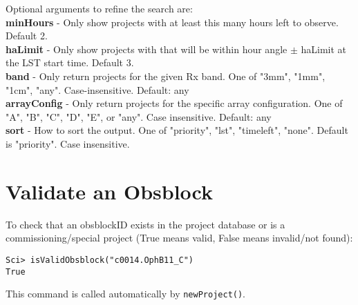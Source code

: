 \documentclass[preprint]{aastex} %
\begin{document}
\noindent Optional arguments to refine the search are:\\
{\bf minHours} - Only show projects with at least this many hours left to observe. Default 2.\\
{\bf haLimit} - Only show projects with that will be within hour angle $\pm$ haLimit at the LST start time. Default 3.\\
{\bf band} - Only return projects for the given Rx band. One of "3mm", "1mm", "1cm", "any". Case-insensitive. Default: any\\
{\bf arrayConfig} - Only return projects for the specific array configuration.
One of "A", "B", "C", "D", "E", or "any".  Case insensitive. Default: any\\
{\bf sort} - How to sort the output. One of "priority", "lst", "timeleft", "none".  Default is "priority".  Case insensitive.

\section{Validate an Obsblock}
To check that an obsblockID exists in the project database or is a
commissioning/special project (True means valid, False means invalid/not found):  
\begin{verbatim}
Sci> isValidObsblock("c0014.OphB11_C")
True
\end{verbatim}
\noindent This command is called automatically by {\tt newProject()}.
\end{document}
